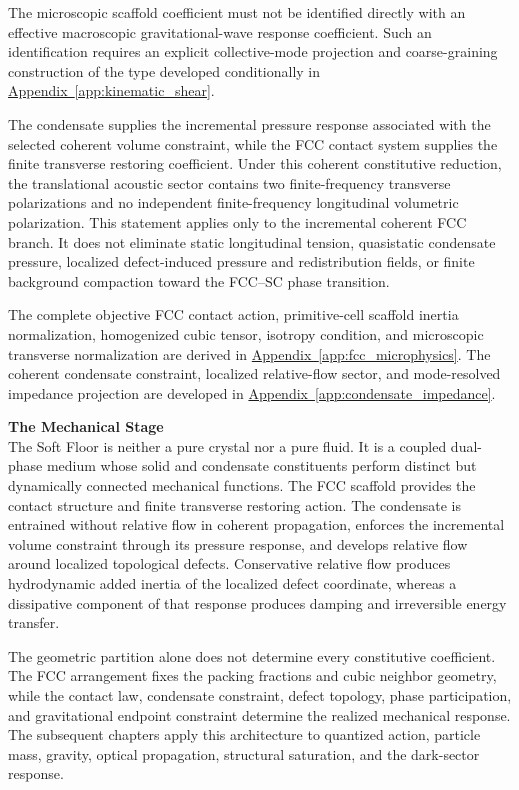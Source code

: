 The microscopic scaffold coefficient must not be identified directly with an effective macroscopic gravitational-wave response coefficient. Such an identification requires an explicit collective-mode projection and coarse-graining construction of the type developed conditionally in \hyperref[app:kinematic_shear]{Appendix~\ref*{app:kinematic_shear}}.

The condensate supplies the incremental pressure response associated with the selected coherent volume constraint, while the FCC contact system supplies the finite transverse restoring coefficient. Under this coherent constitutive reduction, the translational acoustic sector contains two finite-frequency transverse polarizations and no independent finite-frequency longitudinal volumetric polarization. This statement applies only to the incremental coherent FCC branch. It does not eliminate static longitudinal tension, quasistatic condensate pressure, localized defect-induced pressure and redistribution fields, or finite background compaction toward the FCC--SC phase transition.

The complete objective FCC contact action, primitive-cell scaffold inertia normalization, homogenized cubic tensor, isotropy condition, and microscopic transverse normalization are derived in \hyperref[app:fcc_microphysics]{Appendix~\ref*{app:fcc_microphysics}}. The coherent condensate constraint, localized relative-flow sector, and mode-resolved impedance projection are developed in \hyperref[app:condensate_impedance]{Appendix~\ref*{app:condensate_impedance}}.

\noindent\textbf{The Mechanical Stage}\\
The Soft Floor is neither a pure crystal nor a pure fluid. It is a coupled dual-phase medium whose solid and condensate constituents perform distinct but dynamically connected mechanical functions. The FCC scaffold provides the contact structure and finite transverse restoring action. The condensate is entrained without relative flow in coherent propagation, enforces the incremental volume constraint through its pressure response, and develops relative flow around localized topological defects. Conservative relative flow produces hydrodynamic added inertia of the localized defect coordinate, whereas a dissipative component of that response produces damping and irreversible energy transfer.

The geometric partition alone does not determine every constitutive coefficient. The FCC arrangement fixes the packing fractions and cubic neighbor geometry, while the contact law, condensate constraint, defect topology, phase participation, and gravitational endpoint constraint determine the realized mechanical response. The subsequent chapters apply this architecture to quantized action, particle mass, gravity, optical propagation, structural saturation, and the dark-sector response.

